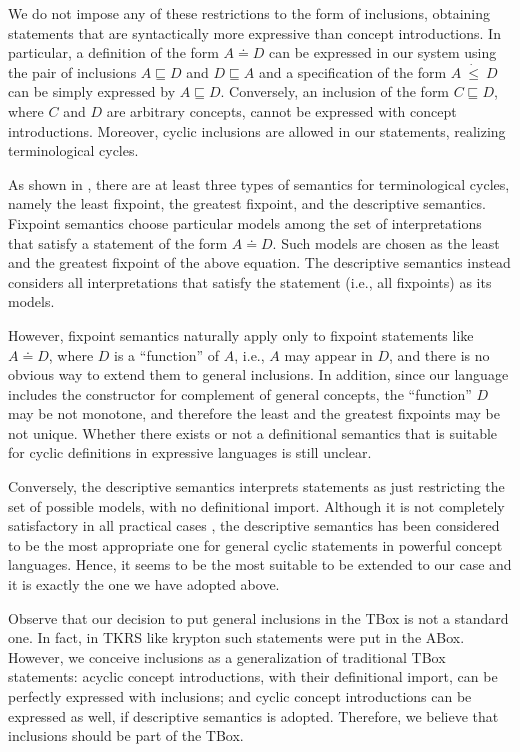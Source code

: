 We do not impose any of these restrictions to the form of inclusions, obtaining
statements that are syntactically more expressive than concept introductions.
In particular, a definition of the form $A \doteq D$ can be expressed in our
system using the pair of inclusions $A \sqsubseteq D$ and $D \sqsubseteq A$ and
a specification of the form $A ~\dot\leq~ D$ can be simply expressed by $A
\sqsubseteq D$. 
Conversely, an inclusion of the form $C \sqsubseteq D$, where $C$ and $D$ are
arbitrary concepts, cannot be expressed with concept introductions.  Moreover,
cyclic inclusions are allowed in our statements, realizing terminological
cycles.

As shown in \cite{Nebe91}, there are at least three types of semantics for
terminological cycles, namely the least fixpoint, the greatest fixpoint,
and the descriptive semantics.  Fixpoint semantics choose particular models
among the set of interpretations that satisfy a statement of the form $A \doteq
D$.  Such models are chosen as the least and the greatest fixpoint of the
above equation. The descriptive semantics instead considers all interpretations
that satisfy the statement (i.e., all fixpoints) as its models.

However, fixpoint semantics naturally apply only to fixpoint 
statements like $A \doteq D$, 
where $D$ is a ``function'' of $A$, i.e., $A$ may appear in $D$, 
and there is no obvious way to extend them to general inclusions. 
In addition, since our language includes the constructor for complement of
general concepts, the ``function'' $D$ may be not monotone, and therefore the
least and the greatest fixpoints may be not unique. 
Whether there exists or not a definitional  semantics that is suitable for cyclic
definitions in expressive languages is still unclear.

Conversely, the descriptive
semantics interprets statements as just
restricting the set of possible models, with no definitional import.
Although it is not completely
satisfactory in all practical cases \cite{Baad90,Nebe91}, the descriptive
semantics  has been considered to be the most appropriate one 
for general cyclic statements in powerful concept languages. 
Hence, it seems to be the most suitable to be 
extended to our case and it is exactly the one we have adopted above.  

\baselineskip

Observe that our decision to put general inclusions in the TBox is not a
standard one. In fact, in TKRS like {\sc krypton} such statements were put in the
ABox. However, we conceive inclusions as a generalization of traditional
TBox statements: acyclic concept introductions, with their definitional import,
can be perfectly expressed with inclusions; and cyclic concept introductions can
be expressed as well, if descriptive semantics is adopted.
Therefore, we believe that inclusions should be part of the TBox. 

